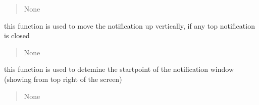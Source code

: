 \documentclass[letterpaper,10pt,english]{sphinxmanual}
\begin{document}
\begin{savenotes}
\begin{fulllineitems}
\begin{savenotes}
\begin{fulllineitems}
\begin{quote}
\begin{description}
\sphinxAtStartPar
None

\end{description}\end{quote}

\end{fulllineitems}\end{savenotes}


\begin{savenotes}\begin{fulllineitems}
\label{\detokenize{setting/notif_UI:oxin.notif_UI.UI_main_window.win_move_top}}
\pysigstartsignatures
{}
\pysigstopsignatures
\sphinxAtStartPar
this function is used to move the notification up vertically, if any top notification is closed
\begin{quote}\begin{description}
\sphinxAtStartPar
None

\end{description}\end{quote}

\end{fulllineitems}\end{savenotes}


\begin{savenotes}\begin{fulllineitems}
\label{\detokenize{setting/notif_UI:oxin.notif_UI.UI_main_window.win_startpoint}}
\pysigstartsignatures
{}
\pysigstopsignatures
\sphinxAtStartPar
this function is used to detemine the startpoint of the notification window (showing from top right of the screen)
\begin{quote}\begin{description}
\sphinxAtStartPar
None

\end{description}\end{quote}

\end{fulllineitems}\end{savenotes}


\end{fulllineitems}\end{savenotes}
\end{document}
